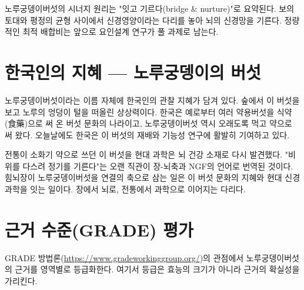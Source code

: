 \documentclass[12pt,oneside]{book}
\begin{document}
노루궁뎅이버섯의 시너지 원리는 "잇고 기르다(bridge \& nurture)"로 요약된다. 보의 토대와 평정의 균형 사이에서 신경영양이라는 다리를 놓아 뇌의 신경망을 기른다. 정량적인 최적 배합비는 앞으로 요인설계 연구가 풀 과제로 남는다.

\section{한국인의 지혜 — 노루궁뎅이의 버섯}

노루궁뎅이버섯이라는 이름 자체에 한국인의 관찰 지혜가 담겨 있다. 숲에서 이 버섯을 보고 노루의 엉덩이 털을 떠올린 상상력이다. 한국은 예로부터 여러 약용버섯을 식약(食藥)으로 써 온 버섯 문화의 나라이고, 노루궁뎅이버섯 역시 오래도록 먹고 약으로 써 왔다. 오늘날에도 한국은 이 버섯의 재배와 기능성 연구에 활발히 기여하고 있다.

전통이 소화기 약으로 쓰던 이 버섯을 현대 과학은 뇌 건강 소재로 다시 발견했다. "비위를 다스려 정기를 기른다"는 오랜 직관이 장-뇌축과 NGF의 언어로 번역된 것이다. 힘뇌장이 노루궁뎅이버섯을 연결의 축으로 삼는 일은 이 버섯 문화의 지혜와 현대 신경과학을 잇는 일이다. 장에서 뇌로, 전통에서 과학으로 이어지는 다리다.

\section{근거 수준(GRADE) 평가}

GRADE 방법론(\url{https://www.gradeworkinggroup.org/})의 관점에서 노루궁뎅이버섯의 근거를 영역별로 등급화한다. 여기서 등급은 효능의 크기가 아니라 근거의 확실성을 가리킨다.

\vspace{2pt}\vspace{3pt}
\end{document}

